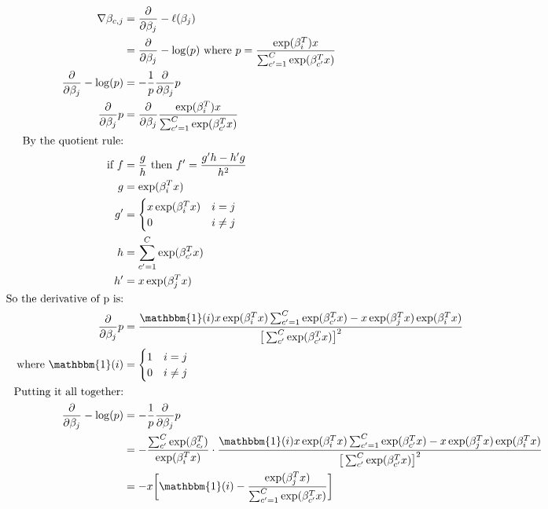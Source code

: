 \documentclass[11pt]{article}
\begin{document}
\begin{align*}
	\nabla \beta_{c,j} &= \frac{\partial}{\partial \beta_{j}} -\ell(\beta_{j})\\
	&= \frac{\partial}{\partial \beta_{j}} -\log(p) \text{   where } p=\frac{\exp(\beta_{i}^{T})x}{\sum_{c^{\prime}=1}^{C}\exp(\beta_{c^{\prime}}^{T}x)}\\
	\frac{\partial}{\partial \beta_{j}} -\log(p) &= -\frac{1}{p} \frac{\partial}{\partial \beta_{j}}p\\
	\frac{\partial}{\partial \beta_{j}}p &= \frac{\partial}{\partial \beta_{j}} \frac{\exp(\beta_{i}^{T})x}{\sum_{c^{\prime}=1}^{C}\exp(\beta_{c^{\prime}}^{T}x)}\\
	\text{By the quotient rule:}&\\
	\text{if  }f &= \frac{g}{h} \text{  then  }f^{\prime}=\frac{g^{\prime}h-h^{\prime}g}{h^{2}}\\
	g &= \exp(\beta_{i}^{T}x)\\
	g^{\prime} &= 
		\begin{cases}
			x\exp(\beta_{i}^{T}x) & i = j\\
	 		0 & i \neq j
	 	\end{cases}
	\\
	h &= \sum_{c^{\prime}=1}^{C}\exp(\beta_{c^{\prime}}^{T}x)\\
	h^{\prime} &= x\exp(\beta_{j}^{T}x)\\
	\text{So the derivative of p is:}&\\
	\frac{\partial}{\partial \beta_{j}}p &= \frac{\mathbbm{1}(i)x \exp(\beta_{i}^{T}x)\sum_{c^{\prime}=1}^{C} \exp(\beta_{c^{\prime}}^{T}x)-x \exp(\beta_{j}^{T}x) \exp(\beta_{i}^{T}x)}{\big[\sum_{c^{\prime}}^{C} \exp(\beta_{c^{\prime}}^{T}x)\big]^{2}}\\
	\text{where  } \mathbbm{1}(i) &=
		\begin{cases}
			1 & i = j\\
			0 & i \neq j
		\end{cases}
	\\
	\text{Putting it all together:}&\\
	\frac{\partial}{\partial \beta_{j}} -\log(p)&=-\frac{1}{p}\frac{\partial}{\partial \beta_{j}}p\\
	&= -\frac{\sum_{c^{\prime}}^{C} \exp(\beta_{c_{\prime}}^{T})}{\exp(\beta_{i}^{T}x)} \cdot \frac{\mathbbm{1}(i)x \exp(\beta_{i}^{T}x)\sum_{c^{\prime}=1}^{C} \exp(\beta_{c^{\prime}}^{T}x)-x \exp(\beta_{j}^{T}x) \exp(\beta_{i}^{T}x)}{\big[\sum_{c^{\prime}}^{C} \exp(\beta_{c^{\prime}}^{T}x)\big]^{2}}\\
	&= -x \bigg[\mathbbm{1}(i)-\frac{\exp(\beta_{j}^{T}x)}{\sum_{c^{\prime}=1}^{C} \exp(\beta_{c^{\prime}}^{T}x)} \bigg]\\
\end{align*}
\end{document}
